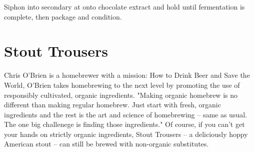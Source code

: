 \documentclass[10pt,oneside]{scrbook}
\begin{document}

\begin{methodandtiming}
 
\begin{mashsteps}
\end{mashsteps}

\begin{fermentationsteps}
\end{fermentationsteps}

\begin{directions}
Siphon into secondary at  onto chocolate extract and hold until fermentation is
complete, then package and condition.
\end{directions}

\end{methodandtiming}

\pagebreak

\begin{ingredientsblock}

\begin{malts}
\end{malts}

\begin{hops}
\end{hops}

\begin{yeasts}
\end{yeasts}

\begin{twists}
\end{twists}

\end{ingredientsblock}

\chapter*{Stout Trousers}

\begin{aboutblock}
Chris O'Brien is a homebrewer with a mission: How to Drink
Beer and Save the World, O'Brien takes homebrewing to the next level
by promoting the use of responsibly cultivated, organic ingredients.
"Making organic homebrew is no different than making regular homebrew.
Just start with fresh, organic ingredients and the rest is the art and
science of homebrewing -- same as usual. The one big challenege is finding those ingredients." Of course, if you can't get your hands on strictly
organic ingredients, Stout Trousers -- a deliciously hoppy American
stout -- can still be brewed with non-organic substitutes.
\end{aboutblock}
\end{document}
